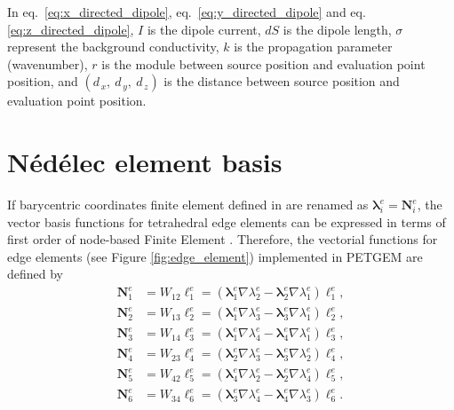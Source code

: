 \documentclass[review]{elsarticle}
\begin{document}
In eq.~\eqref{eq:x_directed_dipole}, eq.~\eqref{eq:y_directed_dipole} and eq.~ \eqref{eq:z_directed_dipole}, $I$ is the dipole current, $dS$ is the dipole length, $\sigma$ represent the background conductivity, $k$ is the propagation parameter (wavenumber), $r$ is the module between source position and evaluation point position, and $(d_{\,x},\: d_{\,y},\: d_{\,z})$ is the distance between source position and evaluation point position.

\section{N\'ed\'elec element basis} 
\label{Appendix_B}
If barycentric coordinates finite element defined in \citet{Zienkiewicz1977, Monk2003}  are renamed as $\boldsymbol{\lambda}^{e}_{i} = \mathbf{N}^{e}_{i}$, the vector basis functions for tetrahedral edge elements can be expressed in terms of first order of node-based Finite Element \citep{Jin2002}. Therefore, the vectorial functions for edge elements (see Figure \ref{fig:edge_element}) implemented in PETGEM  are defined by
\begin{align}
\mathbf{N}^{e}_{1} &= W_{12}\ell^{e}_{1} = (\boldsymbol{\lambda}^{e}_{1} \nabla \lambda^{e}_{2} - \boldsymbol{\lambda}^{e}_{2} \nabla \lambda^{e}_{1}) \ell^{e}_{1}, \label{eq:nedelec_basis_3D1}\\
\mathbf{N}^{e}_{2} &= W_{13}\ell^{e}_{2} = (\boldsymbol{\lambda}^{e}_{1} \nabla \lambda^{e}_{3} - \boldsymbol{\lambda}^{e}_{3} \nabla \lambda^{e}_{1}) \ell^{e}_{2}, \label{eq:nedelec_basis_3D2}\\
\mathbf{N}^{e}_{3} &= W_{14}\ell^{e}_{3} = (\boldsymbol{\lambda}^{e}_{1} \nabla \lambda^{e}_{4} - \boldsymbol{\lambda}^{e}_{4} \nabla \lambda^{e}_{1}) \ell^{e}_{3}, \label{eq:nedelec_basis_3D3}\\
\mathbf{N}^{e}_{4} &= W_{23}\ell^{e}_{4} = (\boldsymbol{\lambda}^{e}_{2} \nabla \lambda^{e}_{3} - \boldsymbol{\lambda}^{e}_{3} \nabla \lambda^{e}_{2}) \ell^{e}_{4}, \label{eq:nedelec_basis_3D4}\\
\mathbf{N}^{e}_{5} &= W_{42}\ell^{e}_{5} = (\boldsymbol{\lambda}^{e}_{4} \nabla \lambda^{e}_{2} - \boldsymbol{\lambda}^{e}_{2} \nabla \lambda^{e}_{4}) \ell^{e}_{5}, \label{eq:nedelec_basis_3D5}\\
\mathbf{N}^{e}_{6} &= W_{34}\ell^{e}_{6} = (\boldsymbol{\lambda}^{e}_{3} \nabla \lambda^{e}_{4} - \boldsymbol{\lambda}^{e}_{4} \nabla \lambda^{e}_{3}) \ell^{e}_{6}. \label{eq:nedelec_basis_3D6}
\end{align}
\end{document}

